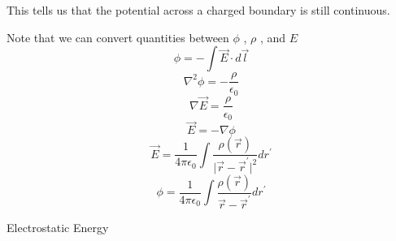 \begin{remark}
\begin{eg}
\[    \]
    This tells us that the potential across a charged boundary is still continuous. 
    \end{eg}
    Note that we can convert quantities between \(\phi \) , \(\rho \) , and \(E\) 
    \[
    \phi  = -\int \vec{E} \cdot d \vec{l} 
    \]
    \[
        \nabla ^{2}  \phi  = -\frac{\rho}{\epsilon _0}
    \]
    \[
        \nabla \vec{E}  = \frac{\rho}{\epsilon _0}
    \]
    \[
        \vec{E} = - \nabla \phi 
    \]
    \[
        \vec{E} = \frac{1}{4\pi \epsilon _0} \int \frac{\rho(\vec{r} )}{\vert \vec{r} - \vec{r} ^{\prime}  \vert ^{2}  }dr^{\prime} 
    \]
    \[
        \phi = \frac{1}{4\pi \epsilon _0} \int \frac{\rho(\vec{r} )}{\vec{r} -\vec{r} ^{\prime} } dr^{\prime} 
    \]
\end{remark}

\begin{remark}
    Electrostatic Energy


\end{remark}
